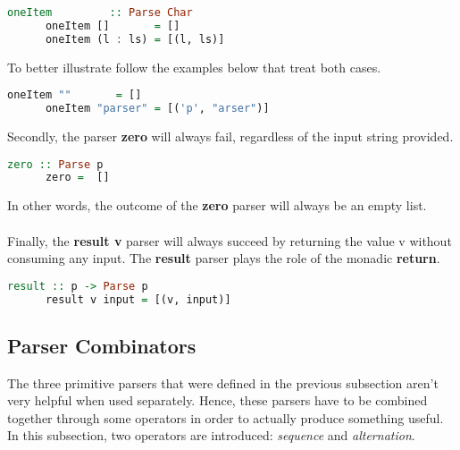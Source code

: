 \documentclass[a4paper, onecolumn]{article}
\begin{document}
    \begin{tcolorbox}
    \begin{lstlisting}[language=Haskell]
      oneItem         :: Parse Char
      oneItem []       = []
      oneItem (l : ls) = [(l, ls)]
    \end{lstlisting}
    \end{tcolorbox}
    
    \noindent To better illustrate follow the examples below that treat both cases.
    \begin{tcolorbox}
    \begin{lstlisting}[language=Haskell]
      oneItem ""       = []
      oneItem "parser" = [('p', "arser")]
    \end{lstlisting}
    \end{tcolorbox}
    \noindent Secondly, the parser \textbf{zero} will always fail, regardless of the input string provided. 
    \begin{tcolorbox}
    \begin{lstlisting}[language=Haskell]
      zero :: Parse p
      zero =  [] 
    \end{lstlisting}
    \end{tcolorbox}
    
    \noindent In other words, the outcome of the \textbf{zero} parser will always be an empty list. \\ \\
    Finally, the \textbf{result v} parser will always succeed by returning the value v without consuming any input. The \textbf{result} parser plays the role of the monadic \textbf{return}. 
    \begin{tcolorbox}
    \begin{lstlisting}[language=Haskell]
      result :: p -> Parse p
      result v input = [(v, input)]
    \end{lstlisting}
    \end{tcolorbox}
    
    \subsection{Parser Combinators}
    
    The three primitive parsers that were defined in the previous subsection aren't very helpful when used separately. Hence, these parsers have to be combined together through some operators in order to actually produce something useful. In this subsection, two operators are introduced: \textit{sequence} and \textit{alternation}. 
    
\end{document}
